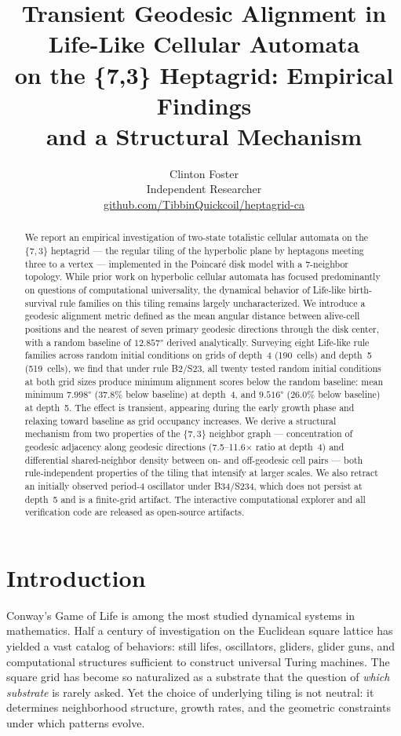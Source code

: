 \documentclass[12pt,a4paper]{article}
\title{Transient Geodesic Alignment in Life-Like Cellular Automata\\
on the \{7,3\} Heptagrid: Empirical Findings\\
and a Structural Mechanism}
\author{Clinton Foster\\
\small Independent Researcher\\
\small \href{https://github.com/TibbinQuickcoil/heptagrid-ca}{github.com/TibbinQuickcoil/heptagrid-ca}}
\date{}
\begin{document}
\maketitle

\begin{abstract}
We report an empirical investigation of two-state totalistic cellular automata on the $\{7,3\}$ heptagrid --- the regular tiling of the hyperbolic plane by heptagons meeting three to a vertex --- implemented in the Poincar\'{e} disk model with a 7-neighbor topology. While prior work on hyperbolic cellular automata has focused predominantly on questions of computational universality, the dynamical behavior of Life-like birth-survival rule families on this tiling remains largely uncharacterized. We introduce a geodesic alignment metric defined as the mean angular distance between alive-cell positions and the nearest of seven primary geodesic directions through the disk center, with a random baseline of $12.857°$ derived analytically. Surveying eight Life-like rule families across random initial conditions on grids of depth~4 (190~cells) and depth~5 (519~cells), we find that under rule B2/S23, all twenty tested random initial conditions at both grid sizes produce minimum alignment scores below the random baseline: mean minimum $7.998°$ (37.8\% below baseline) at depth~4, and $9.516°$ (26.0\% below baseline) at depth~5. The effect is transient, appearing during the early growth phase and relaxing toward baseline as grid occupancy increases. We derive a structural mechanism from two properties of the $\{7,3\}$ neighbor graph --- concentration of geodesic adjacency along geodesic directions (7.5--11.6$\times$ ratio at depth~4) and differential shared-neighbor density between on- and off-geodesic cell pairs --- both rule-independent properties of the tiling that intensify at larger scales. We also retract an initially observed period-4 oscillator under B34/S234, which does not persist at depth~5 and is a finite-grid artifact. The interactive computational explorer and all verification code are released as open-source artifacts.
\end{abstract}

\section{Introduction}

Conway's Game of Life \cite{Gardner1970} is among the most studied dynamical systems in mathematics. Half a century of investigation on the Euclidean square lattice has yielded a vast catalog of behaviors: still lifes, oscillators, gliders, glider guns, and computational structures sufficient to construct universal Turing machines. The square grid has become so naturalized as a substrate that the question of \emph{which substrate} is rarely asked. Yet the choice of underlying tiling is not neutral: it determines neighborhood structure, growth rates, and the geometric constraints under which patterns evolve.
\end{document}
